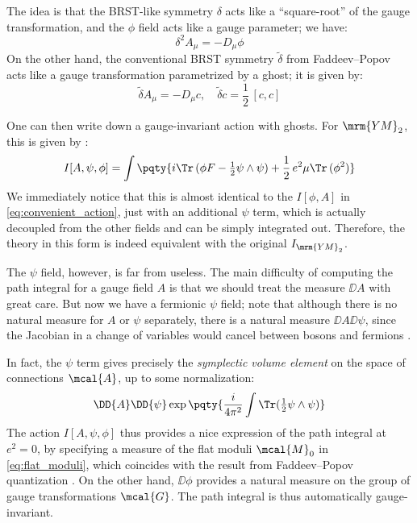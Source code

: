 \documentclass[a4paper
	,10pt
]{article}
\newcommand{\YM}{{\ensuremath{\mrm{YM}_2}}\xspace}
\begin{document}
	The idea is that the BRST-like symmetry $\delta$ acts like a ``square-root'' of the gauge transformation, and the $\phi$ field acts like a gauge parameter; we have:
	\begin{equation}
		\delta^2 A_\mu = -D_\mu \phi
	\end{equation}
	On the other hand, the conventional BRST symmetry $\tilde{\delta}$ from Faddeev--Popov acts like a gauge transformation parametrized by a ghost; it is given by:
	\begin{equation}
		\tilde{\delta}{A_\mu} = -D_\mu c,
	\quad
		\tilde{\delta}{c} = \frac{1}{2}\,[c,c]
	\end{equation}
	
	One can then write down a gauge-invariant action with ghosts. For \YM, this is given by \cite{Cordes:1994fc,Witten:1992xu}:
	\begin{equation}
		I[A,\psi,\phi]
		= \int \pqty{
				i \Tr\,(\phi F - \tfrac{1}{2}\psi\wedge\psi)
				+ \frac{1}{2}\, e^2\mu \Tr\,(\phi^2)
			}
	\label{eq:cartan_action}
	\end{equation}
	We immediately notice that this is almost identical to the $I[\phi,A]$ in \eqref{eq:convenient_action}, just with an additional $\psi$ term, which is actually decoupled from the other fields and can be simply integrated out. Therefore, the theory in this form is indeed equivalent with the original $I_\YM$. 
	
	The $\psi$ field, however, is far from useless. The main difficulty of computing the path integral for a gauge field $A$ is that we should treat the measure $\DD{A}$ with great care. But now we have a fermionic $\psi$ field; note that although there is no natural measure for $A$ or $\psi$ separately, there is a natural measure $\DD{A} \DD{\psi}$, since the Jacobian in a change of variables would cancel between bosons and fermions \cite{Witten:1992xu}. 
	
	In fact, the $\psi$ term gives precisely the \textit{symplectic volume element} on the space of connections $\mcal{A}$, up to some normalization:
	\begin{equation}
		\DD{A} \DD{\psi}
			\exp \pqty{
				\frac{i}{4\pi^2}
				\int \Tr (\tfrac{1}{2} \psi\wedge\psi)
			}
	\end{equation}
	The action $I[A,\psi,\phi]$ thus provides a nice expression of the path integral at $e^2 = 0$, by specifying a measure of the flat moduli $\mcal{M}_0$ in \eqref{eq:flat_moduli}, which coincides with the result from Faddeev--Popov quantization \cite{Witten:1991we}. On the other hand, $\DD{\phi}$ provides a natural measure on the group of gauge transformations $\mcal{G}$. The path integral is thus automatically gauge-invariant. 
	
\end{document}
